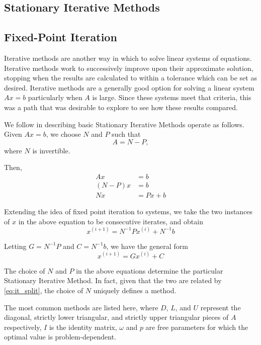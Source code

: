 \documentclass[10pt]{article}
\newcommand{\iter}[1]{^{(#1)}}
\begin{document}
\begin{multicols}{2}
\section{Stationary Iterative Methods}
\subsection{Fixed-Point Iteration}
Iterative methods are another way in which to solve linear systems of equations.
Iterative methods work to successively improve upon their approximate solution, stopping when the results are calculated to within a tolerance which can be set as desired.
Iterative methods are a generally good option for solving a linear system $Ax=b$ particularly when $A$ is large.
Since these systems meet that criteria, this was a path that was desirable to explore to see how these results compared.


We follow \citet[Section 1.1]{anderson_analysis_2012} in describing basic Stationary Iterative Methods operate as follows.
Given $Ax = b$, we choose $N$ and $P$ such that 
\begin{equation}
	A = N-P,
	\label{eq:it_split}
\end{equation}
where $N$ is invertible.

Then,
\begin{align*}
    Ax &= b \\
    (N-P)x &= b \\
    Nx &= Px + b
\end{align*}

Extending the idea of fixed point iteration to systems, we take the two instances of $x$ in the above equation to be consecutive iterates, and obtain
\begin{equation}
    x\iter{i+1} = N^{-1}Px\iter{i} + N^{-1}b
    \label{eq:it_np}
\end{equation}

Letting $G=N^{-1}P$ and $C=N^{-1}b$, we have the general form
\begin{equation}
    x\iter{i+1} = Gx\iter{i} + C
    \label{eq:it_g}
\end{equation}

The choice of $N$ and $P$ in the above equations determine the particular Stationary Iterative Method.
In fact, given that the two are related by \eqref{eq:it_split}, the choice of $N$ uniquely defines a method.

The most common methods are listed here, where $D$, $L$, and $U$ represent the diagonal, strictly lower triangular, and strictly upper triangular pieces of $A$ respectively, $I$ is the identity matrix, $\omega$ and $p$ are free parameters for which the optimal value is problem-dependent.


\end{multicols}
\end{document}
